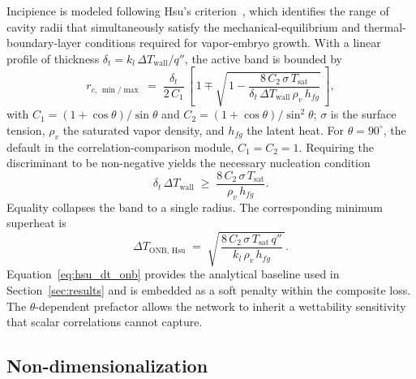 Incipience is modeled following Hsu's criterion~\citep{hsu1962}, which
identifies the range of cavity radii that simultaneously satisfy the
mechanical-equilibrium and thermal-boundary-layer conditions required for
vapor-embryo growth. With a linear
profile of thickness $\delta_t = k_l\,\Delta T_{\mathrm{wall}}/q''$, the
active band is bounded by
%
\begin{equation}\label{eq:hsu_rc_range}
r_{c,\,\min/\max} \;=\;
\frac{\delta_t}{2\,C_1}\,
\left[\,1 \mp \sqrt{\,1 - \frac{8\,C_2\,\sigma\,T_{\mathrm{sat}}}{\delta_t\,\Delta T_{\mathrm{wall}}\,\rho_v\,h_{fg}}}\,\right],
\end{equation}
%
with $C_1 = (1+\cos\theta)/\sin\theta$ and
$C_2 = (1+\cos\theta)/\sin^{2}\theta$; $\sigma$ is the surface tension,
$\rho_v$ the saturated vapor density, and $h_{fg}$ the latent heat. For
$\theta = 90^{\circ}$, the default in the correlation-comparison module,
$C_1 = C_2 = 1$. Requiring the discriminant to be non-negative yields the
necessary nucleation condition
%
\begin{equation}\label{eq:hsu_discriminant}
\delta_t\,\Delta T_{\mathrm{wall}}
\;\ge\; \frac{8\,C_2\,\sigma\,T_{\mathrm{sat}}}{\rho_v\,h_{fg}}.
\end{equation}
%
Equality collapses the band to a single radius. The corresponding minimum
superheat is
%
\begin{equation}\label{eq:hsu_dt_onb}
\Delta T_{\mathrm{ONB,\,Hsu}}
\;=\; \sqrt{\,\frac{8\,C_2\,\sigma\,T_{\mathrm{sat}}\,q''}{k_l\,\rho_v\,h_{fg}}\,}.
\end{equation}
%
Equation~\eqref{eq:hsu_dt_onb} provides the analytical baseline used in
Section~\ref{sec:results} and is embedded as a soft penalty within the
composite loss. The $\theta$-dependent prefactor allows the network to
inherit a wettability sensitivity that scalar correlations cannot
capture.

\subsection{Non-dimensionalization}\label{subsec:nondim}\label{subsec:dimless}

